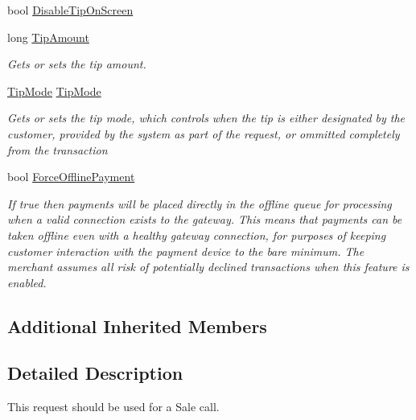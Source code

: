 \begin{DoxyCompactItemize}
bool \hyperlink{classcom_1_1clover_1_1remotepay_1_1sdk_1_1_sale_request_a1ecc113e6e74c09bcfdb22fde2935693}{Disable\+Tip\+On\+Screen}
\item 
long \hyperlink{classcom_1_1clover_1_1remotepay_1_1sdk_1_1_sale_request_a2c5929123c6d790a089b31cb1f6661fc}{Tip\+Amount}
\begin{DoxyCompactList}\small\item\em Gets or sets the tip amount. \end{DoxyCompactList}\item 
\hyperlink{namespacecom_1_1clover_1_1remotepay_1_1sdk_a3d5c6c8529ad6bcdc5a4fd5224361ac5}{Tip\+Mode} \hyperlink{classcom_1_1clover_1_1remotepay_1_1sdk_1_1_sale_request_a18d23b1e889f262b8586511f983fd54c}{Tip\+Mode}
\begin{DoxyCompactList}\small\item\em Gets or sets the tip mode, which controls when the tip is either designated by the customer, provided by the system as part of the request, or ommitted completely from the transaction \end{DoxyCompactList}\item 
bool \hyperlink{classcom_1_1clover_1_1remotepay_1_1sdk_1_1_sale_request_a3b9ec1f158eda7a094c83a34a6c2e02a}{Force\+Offline\+Payment}
\begin{DoxyCompactList}\small\item\em If true then payments will be placed directly in the offline queue for processing when a valid connection exists to the gateway. This means that payments can be taken offline even with a healthy gateway connection, for purposes of keeping customer interaction with the payment device to the bare minimum. The merchant assumes all risk of potentially declined transactions when this feature is enabled. \end{DoxyCompactList}\end{DoxyCompactItemize}
\subsection*{Additional Inherited Members}


\subsection{Detailed Description}
This request should be used for a Sale call. 



